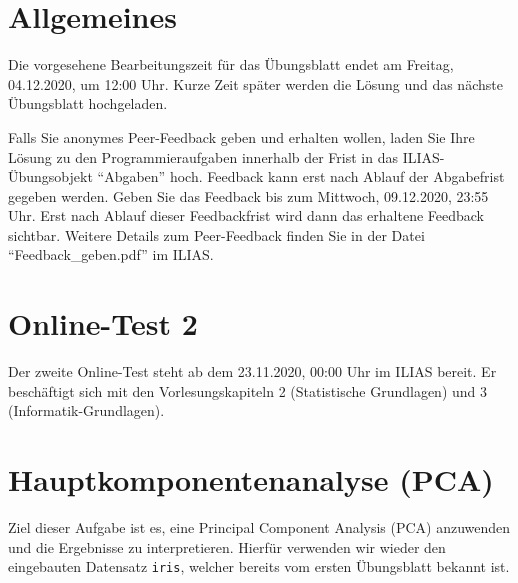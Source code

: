 \documentclass[headinclude,headsepline]{scrartcl}
\newcommand{\code}[1]{{\color[HTML]{000080}\texttt{#1}}}
\begin{document}
\section*{Allgemeines}

Die vorgesehene Bearbeitungszeit für das Übungsblatt endet am Freitag, 04.12.2020, um 12:00 Uhr.
Kurze Zeit später werden die Lösung und das nächste Übungsblatt hochgeladen.

Falls Sie anonymes Peer-Feedback geben und erhalten wollen, laden Sie Ihre Lösung zu den Programmieraufgaben innerhalb der Frist in das ILIAS-Übungsobjekt ``Abgaben'' hoch.
Feedback kann erst nach Ablauf der Abgabefrist gegeben werden.
Geben Sie das Feedback bis zum Mittwoch, 09.12.2020, 23:55 Uhr.
Erst nach Ablauf dieser Feedbackfrist wird dann das erhaltene Feedback sichtbar.
Weitere Details zum Peer-Feedback finden Sie in der Datei ``Feedback\_geben.pdf'' im ILIAS.

\section{Online-Test 2}

Der zweite Online-Test steht ab dem 23.11.2020, 00:00 Uhr im ILIAS bereit.
Er beschäftigt sich mit den Vorlesungskapiteln 2 (Statistische Grundlagen) und 3 (Informatik-Grundlagen).

\section{Hauptkomponentenanalyse (PCA)}

Ziel dieser Aufgabe ist es, eine Principal Component Analysis (PCA) anzuwenden und die Ergebnisse zu interpretieren.
Hierfür verwenden wir wieder den eingebauten Datensatz \code{iris}, welcher bereits vom ersten Übungsblatt bekannt ist.

\vspace{10pt}
\end{document}
